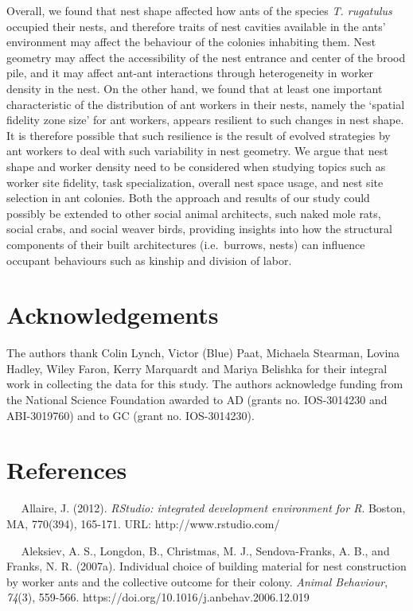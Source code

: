 \documentclass[3p]{elsarticle} %
\begin{document}
Overall, we found that nest shape affected how ants of the species
\emph{T. rugatulus} occupied their nests, and therefore traits of nest
cavities available in the ants' environment may affect the behaviour of
the colonies inhabiting them. Nest geometry may affect the accessibility
of the nest entrance and center of the brood pile, and it may affect
ant-ant interactions through heterogeneity in worker density in the
nest. On the other hand, we found that at least one important
characteristic of the distribution of ant workers in their nests, namely
the `spatial fidelity zone size' for ant workers, appears resilient to
such changes in nest shape. It is therefore possible that such
resilience is the result of evolved strategies by ant workers to deal
with such variability in nest geometry. We argue that nest shape and
worker density need to be considered when studying topics such as worker
site fidelity, task specialization, overall nest space usage, and nest
site selection in ant colonies. Both the approach and results of our
study could possibly be extended to other social animal architects, such
naked mole rats, social crabs, and social weaver birds, providing
insights into how the structural components of their built architectures
(i.e.~burrows, nests) can influence occupant behaviours such as kinship
and division of labor.

\hypertarget{acknowledgements}{%
\section{Acknowledgements}\label{acknowledgements}}

The authors thank Colin Lynch, Victor (Blue) Paat, Michaela Stearman,
Lovina Hadley, Wiley Faron, Kerry Marquardt and Mariya Belishka for
their integral work in collecting the data for this study. The authors
acknowledge funding from the National Science Foundation awarded to AD
(grants no. IOS-3014230 and ABI-3019760) and to GC (grant no.
IOS-3014230).

\hypertarget{references}{%
\section{References}\label{references}}

~~ Allaire, J. (2012). \emph{RStudio: integrated development environment
for R}. Boston, MA, 770(394), 165-171. URL: http://www.rstudio.com/

~~ Aleksiev, A. S., Longdon, B., Christmas, M. J., Sendova-Franks, A.
B., and Franks, N. R. (2007a). Individual choice of building material
for nest construction by worker ants and the collective outcome for
their colony. \emph{Animal Behaviour}, \emph{74}(3), 559-566.
https://doi.org/10.1016/j.anbehav.2006.12.019
\end{document}

